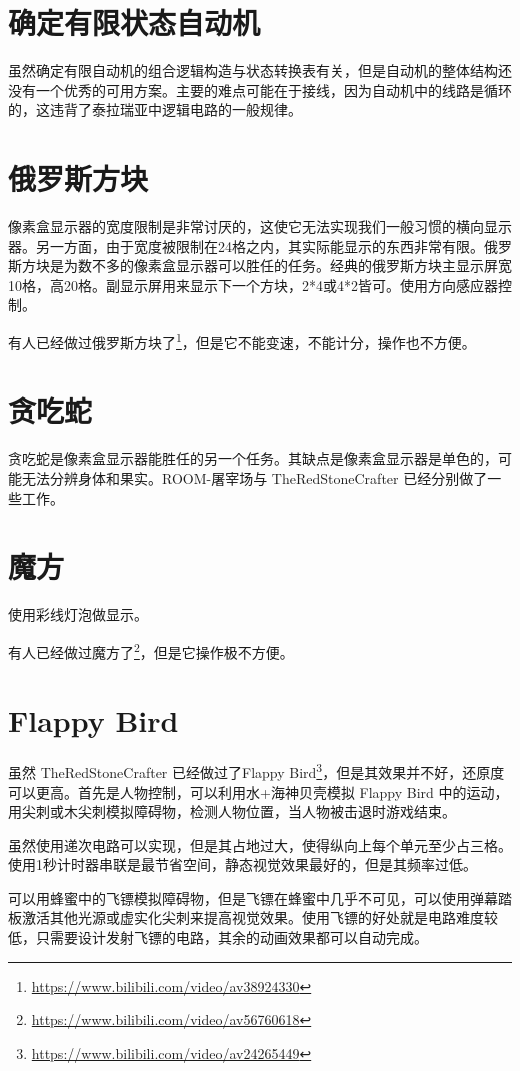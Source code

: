 \section{确定有限状态自动机}
虽然确定有限自动机的组合逻辑构造与状态转换表有关，但是自动机的整体结构还没有一个优秀的可用方案。主要的难点可能在于接线，因为自动机中的线路是循环的，这违背了泰拉瑞亚中逻辑电路的一般规律。

\section{俄罗斯方块}
像素盒显示器的宽度限制是非常讨厌的，这使它无法实现我们一般习惯的横向显示器。另一方面，由于宽度被限制在24格之内，其实际能显示的东西非常有限。俄罗斯方块是为数不多的像素盒显示器可以胜任的任务。经典的俄罗斯方块主显示屏宽10格，高20格。副显示屏用来显示下一个方块，2*4或4*2皆可。使用方向感应器控制。

有人已经做过俄罗斯方块了\footnote{\url{https://www.bilibili.com/video/av38924330}}，但是它不能变速，不能计分，操作也不方便。

\section{贪吃蛇}
贪吃蛇是像素盒显示器能胜任的另一个任务。其缺点是像素盒显示器是单色的，可能无法分辨身体和果实。ROOM-屠宰场与 TheRedStoneCrafter 已经分别做了一些工作。

\section{魔方}
使用彩线灯泡做显示。

有人已经做过魔方了\footnote{\url{https://www.bilibili.com/video/av56760618}}，但是它操作极不方便。

\section{Flappy Bird}
虽然 TheRedStoneCrafter 已经做过了Flappy Bird\footnote{\url{https://www.bilibili.com/video/av24265449}}，但是其效果并不好，还原度可以更高。首先是人物控制，可以利用水+海神贝壳模拟 Flappy Bird 中的运动，用尖刺或木尖刺模拟障碍物，检测人物位置，当人物被击退时游戏结束。

虽然使用递次电路可以实现，但是其占地过大，使得纵向上每个单元至少占三格。使用1秒计时器串联是最节省空间，静态视觉效果最好的，但是其频率过低。

可以用蜂蜜中的飞镖模拟障碍物，但是飞镖在蜂蜜中几乎不可见，可以使用弹幕踏板激活其他光源或虚实化尖刺来提高视觉效果。使用飞镖的好处就是电路难度较低，只需要设计发射飞镖的电路，其余的动画效果都可以自动完成。

